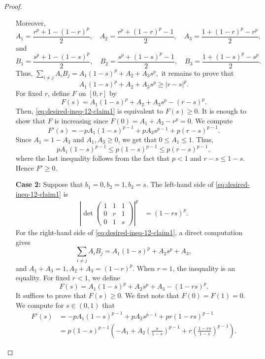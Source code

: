 \documentclass[11pt,a4paper]{amsart}
\theoremstyle{plain}
\theoremstyle{definition}
\begin{document}
\begin{proof}
\begin{enumerate}[wide =0pt, labelwidth= 1.1cm]
        Moreover, 
            $$A_1 = \frac{r^p + 1 - (1-r)^p}{2}, \quad A_2 = \frac{r^p + (1-r)^p - 1}{2}, \quad A_3 = \frac{1 + (1-r)^p-r^p}{2}, $$
        and 
            $$B_1 = \frac{s^p + 1 - (1-s)^p}{2}, \quad B_2 = \frac{s^p + (1-s)^p - 1}{2},\quad B_3 = \frac{1 + (1-s)^p-s^p}{2} .$$
        Thus,
            $\sum_{i \neq j} A_i B_j = A_1 (1-s)^p + A_2 + A_3s^p ,$
        it remains to prove that $$A_1 (1-s)^p + A_2 + A_3s^p \geq |r-s|^p.$$ 
        For fixed $r$, define $F$ on $[0,r]$ by
        \[
            F(s) = A_1 (1-s)^p + A_2 + A_3s^p - (r-s)^p.
        \]
        Then, \eqref{eq:desired-ineq-12-claim1} is equivalent to $F(s) \geq 0$. It is enough to show that $F$ is increasing since $F(0) = A_1+A_2-r^p = 0$.
        We compute
        $$
            F' (s) =  -pA_1(1-s)^{p-1} +pA_3s^{p-1} + p(r-s)^{p-1}.
        $$
        Since $A_1 = 1-A_3$ and $A_1,A_3 \geq 0$, we get that $0\leq A_1 \leq 1$. Thus,
        \[
            pA_1(1-s)^{p-1} \leq p(1-s)^{p-1} \leq p(r-s)^{p-1},
        \]
        where the last inequality follows from the fact that $ p<1$ and $r-s \leq 1-s$. Hence $F' \geq 0$. 
        \item[\bf Case 2:] Suppose that $b_1 = 0, b_2 =1,b_3 =s$. 
        The left-hand side of \eqref{eq:desired-ineq-12-claim1} is 
        \begin{align}
    \left|\operatorname{det}\left(\begin{array}{ccc}1 & 1 & 1 \\ 0 & r & 1 \\ 0 & 1 & s\end{array}\right)\right|^p   
            &= (1-rs)^p.
        \end{align}
        For the right-hand side of \eqref{eq:desired-ineq-12-claim1}, a direct computation gives 
        \[
             \sum_{i \neq j} A_i B_j = A_1 (1-s)^p + A_2 s^p + A_3,
        \]
        and $A_1+A_3 = 1, A_2 +A_3 = (1-r)^p$. When $r =1$, the inequality is an equality.
        For fixed $r <1$, we define 
        \[
            F(s) = A_1 (1-s)^p + A_2 s^p + A_3 - (1-rs)^p.
        \]
        It suffices to prove that $F(s) \geq 0$. We first note that $F(0) = F(1) = 0$.
        We compute for $s \in (0,1)$ that
        \begin{align}
            F'(s) &= -pA_1 (1-s)^{p-1} +pA_2s^{p-1} + pr(1-rs)^{p-1} 
            \\
            &= p(1-s)^{p-1} \left( -A_1 +A_2\left(\frac{s}{1-s}\right)^{p-1}+ r \left(\frac{1-rs}{1-s}\right)^{p-1} \right) .
        \end{align}

\end{enumerate}
\end{proof}
\end{document}
